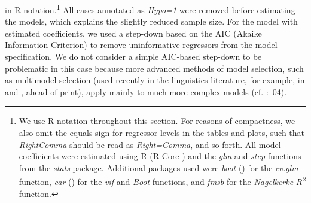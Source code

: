 in R notation.\footnote{We use R notation throughout this section. For reasons of compactness, we also omit the equals sign for regressor levels in the tables and plots, such that \textit{RightComma} should be read as \textit{Right=Comma}, and so forth. All model coefficients were estimated using R (R Core \citealt{Team2013}) and the \textit{glm} and \textit{step} functions from the \textit{stats} package. Additional packages used were \textit{boot} (\citealt{CantyRipley2013}) for the \textit{cv.glm} function, \textit{car} (\citealt{FoxWeisberg2011}) for the \textit{vif} and \textit{Boot} functions, and \textit{fmsb} \citep{Nakazawa2014} for the \textit{Nagelkerke} \textit{R\textsuperscript{2}} function.} All cases annotated as \textit{Hypo=1} were removed before estimating the models, which explains the slightly reduced sample size. For the model with estimated coefficients, we used a step-down based on the AIC (Akaike Information Criterion) to remove uninformative regressors from the model specification. We do not consider a simple AIC-based step-down to be problematic in this case because more advanced methods of model selection, such as multimodel selection (used recently in the linguistics literature, for example, in \citealt{KupermanBresnan2012} and \citealt{BarthKapatsinski2014}, ahead of print), apply mainly to much more complex models (cf. \citealt{BurnhamAnderson2002}:~04).




